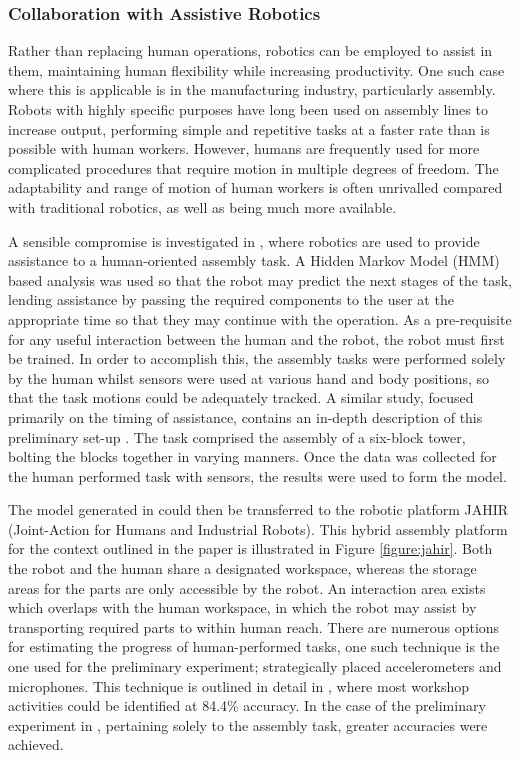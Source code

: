 \documentclass[11pt]{article}
\begin{document}
\subsubsection{Collaboration with Assistive Robotics}
Rather than replacing human operations, robotics can be employed to assist in them, maintaining human flexibility while increasing productivity. One such case where this is applicable is in the manufacturing industry, particularly assembly. Robots with highly specific purposes have long been used on assembly lines to increase output, performing simple and repetitive tasks at a faster rate than is possible with human workers. However, humans are frequently used for more complicated procedures that require motion in multiple degrees of freedom. The adaptability and range of motion of human workers is often unrivalled compared with traditional robotics, as well as being much more available. 

A sensible compromise is investigated in \cite{lenz2011}, where robotics are used to provide assistance to a human-oriented assembly task. A Hidden Markov Model (HMM) based analysis was used so that the robot may predict the next stages of the task, lending assistance by passing the required components to the user at the appropriate time so that they may continue with the operation. As a pre-requisite for any useful interaction between the human and the robot, the robot must first be trained. In order to accomplish this, the assembly tasks were performed solely by the human whilst sensors were used at various hand and body positions, so that the task motions could be adequately tracked. A similar study, focused primarily on the timing of assistance, contains an in-depth description of this preliminary set-up \cite{huber2010}. The task comprised the assembly of a six-block tower, bolting the blocks together in varying manners. Once the data was collected for the human performed task with sensors, the results were used to form the model.

The model generated in \cite{lenz2011} could then be transferred to the robotic platform JAHIR (Joint-Action for Humans and Industrial Robots). This hybrid assembly platform for the context outlined in the paper is illustrated in Figure \ref{figure:jahir}. Both the robot and the human share a designated workspace, whereas the storage areas for the parts are only accessible by the robot. An interaction area exists which overlaps with the human workspace, in which the robot may assist by transporting required parts to within human reach. There are numerous options for estimating the progress of human-performed tasks, one such technique is the one used for the preliminary experiment; strategically placed accelerometers and microphones. This technique is outlined in detail in \cite{lukowicz2004}, where most workshop activities could be identified at 84.4\% accuracy. In the case of the preliminary experiment in \cite{lenz2011}, pertaining solely to the assembly task, greater accuracies were achieved.
\end{document}
